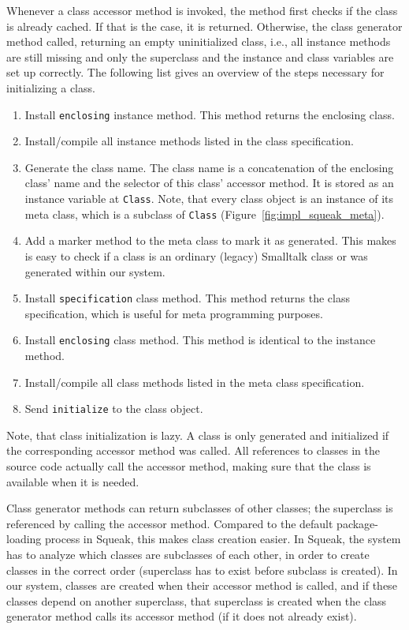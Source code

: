 Whenever a class accessor method is invoked, the method first checks if the class is already cached. If that is the case, it is returned. Otherwise, the class generator method called, returning an empty uninitialized class, i.e., all instance methods are still missing and only the superclass and the instance and class variables are set up correctly. The following list gives an overview of the steps necessary for initializing a class.

\begin{enumerate}
	\item Install \texttt{enclosing} instance method. This method returns the enclosing class.
	\item Install/compile all instance methods listed in the class specification.
	\item Generate the class name. The class name is a concatenation of the enclosing class' name and the selector of this class' accessor method. It is stored as an instance variable at \texttt{Class}. Note, that every class object is an instance of its meta class, which is a subclass of \texttt{Class} (Figure~\ref{fig:impl_squeak_meta}).
	\item Add a marker method to the meta class to mark it as generated. This makes is easy to check if a class is an ordinary (legacy) Smalltalk class or was generated within our system.
	\item Install \texttt{specification} class method. This method returns the class specification, which is useful for meta programming purposes.
	\item Install \texttt{enclosing} class method. This method is identical to the instance method.
	\item Install/compile all class methods listed in the meta class specification.
	\item Send \texttt{initialize} to the class object.
\end{enumerate}

Note, that class initialization is lazy. A class is only generated and initialized if the corresponding accessor method was called. All references to classes in the source code actually call the accessor method, making sure that the class is available when it is needed. 

Class generator methods can return subclasses of other classes; the superclass is referenced by calling the accessor method. Compared to the default package-loading process in Squeak, this makes class creation easier. In Squeak, the system has to analyze which classes are subclasses of each other, in order to create classes in the correct order (superclass has to exist before subclass is created). In our system, classes are created when their accessor method is called, and if these classes depend on another superclass, that superclass is created when the class generator method calls its accessor method (if it does not already exist).

